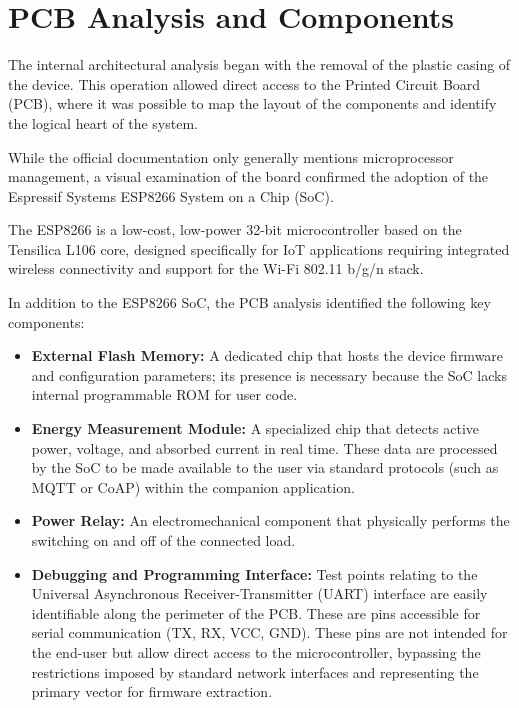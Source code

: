 \section{PCB Analysis and Components}
The internal architectural analysis began with the removal of the plastic casing of the device. This operation allowed direct access to the Printed Circuit Board (PCB), where it was possible to map the layout of the components and identify the logical heart of the system.

\noindent While the official documentation only generally mentions microprocessor management, a visual examination of the board confirmed the adoption of the Espressif Systems ESP8266 System on a Chip (SoC).

\noindent The ESP8266 is a low-cost, low-power 32-bit microcontroller based on the Tensilica L106 core, designed specifically for IoT applications requiring integrated wireless connectivity and support for the Wi-Fi 802.11 b/g/n stack.

\medskip
\noindent In addition to the ESP8266 SoC, the PCB analysis identified the following key components:
\begin{itemize}
    \item \textbf{External Flash Memory:} A dedicated chip that hosts the device firmware and configuration parameters; its presence is necessary because the SoC lacks internal programmable ROM for user code.
    
    \item \textbf{Energy Measurement Module:} A specialized chip that detects active power, voltage, and absorbed current in real time. These data are processed by the SoC to be made available to the user via standard protocols (such as MQTT or CoAP) within the companion application.
    
    \item \textbf{Power Relay:} An electromechanical component that physically performs the switching on and off of the connected load.
    
    \item \textbf{Debugging and Programming Interface:} Test points relating to the Universal Asynchronous Receiver-Transmitter (UART) interface are easily identifiable along the perimeter of the PCB. These are pins accessible for serial communication (TX, RX, VCC, GND). These pins are not intended for the end-user but allow direct access to the microcontroller, bypassing the restrictions imposed by standard network interfaces and representing the primary vector for firmware extraction.
\end{itemize}

